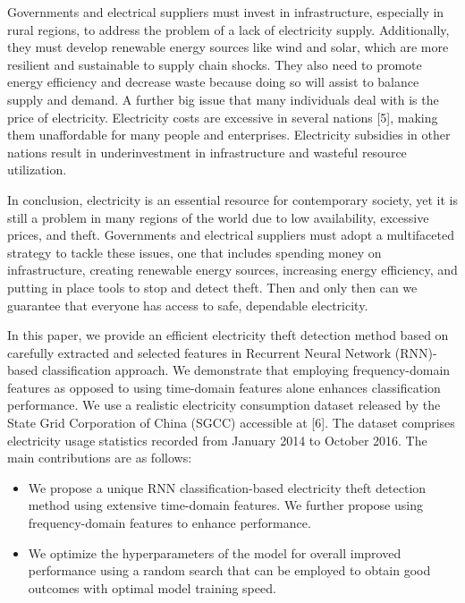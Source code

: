 \documentclass{ieeeaccess}
\begin{document}
Governments and electrical suppliers must invest in infrastructure, especially in rural regions, to address the problem of a lack of electricity supply. Additionally, they must develop renewable energy sources like wind and solar, which are more resilient and sustainable to supply chain shocks. They also need to promote energy efficiency and decrease waste because doing so will assist to balance supply and demand.
A further big issue that many individuals deal with is the price of electricity. Electricity costs are excessive in several nations [5], making them unaffordable for many people and enterprises. Electricity subsidies in other nations result in underinvestment in infrastructure and wasteful resource utilization.


In conclusion, electricity is an essential resource for contemporary society, yet it is still a problem in many regions of the world due to low availability, excessive prices, and theft. Governments and electrical suppliers must adopt a multifaceted strategy to tackle these issues, one that includes spending money on infrastructure, creating renewable energy sources, increasing energy efficiency, and putting in place tools to stop and detect theft. Then and only then can we guarantee that everyone has access to safe, dependable electricity.

In this paper, we provide an efficient electricity theft detection method based on carefully extracted and selected features in Recurrent Neural Network (RNN)-based classification approach. We demonstrate that employing frequency-domain features as opposed to using time-domain features alone enhances classification performance. We use a realistic electricity consumption dataset released by the State Grid Corporation of China (SGCC) accessible at [6]. The dataset comprises electricity usage statistics recorded from January 2014 to October 2016. The main contributions are as follows:
\begin{itemize}

\item We propose a unique RNN classification-based electricity theft detection method using extensive time-domain features. We further propose using frequency-domain features to enhance performance.

\item We optimize the hyperparameters of the model for overall improved performance using a random search that can be employed to obtain good outcomes with optimal model training speed. 

\end{itemize}
\end{document}
